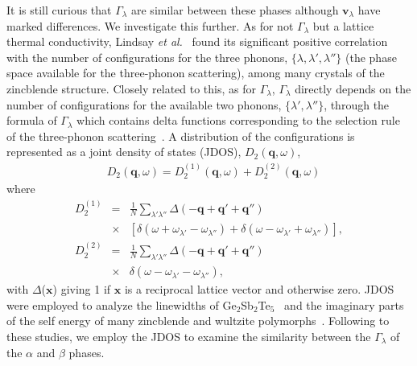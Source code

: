 \documentclass[twocolumn,amsmath,amssymb,a4paper,prb,superscriptaddress,floatfix]{revtex4-1}
\begin{document}
It is still curious that $\Gamma_\lambda$ are similar between these phases
although $\mathbf{v}_\lambda$ have marked differences.  We investigate this
further.  As for not $\Gamma_{\lambda}$ but a lattice thermal conductivity,
Lindsay {\it et al.}~\cite{Lindsay} found its significant positive correlation
with the number of configurations for the three phonons, $\{\lambda, \lambda',
\lambda''\}$ (the phase space available for the three-phonon scattering), among
many crystals of the zincblende structure.  Closely related to this, as for
$\Gamma_{\lambda}$, $\Gamma_{\lambda}$ directly depends on the number of
configurations for the available two phonons, $\{\lambda', \lambda''\}$, through
the formula of $\Gamma_{\lambda}$ which contains delta functions corresponding
to the selection rule of the three-phonon scattering~\cite{phono3py}.  A
distribution of the configurations is represented as a joint density of states
(JDOS), ${D_2(\mathbf{q},\omega)}$,  
\begin{align}
 \label{eq:jdos}
 &D_2(\mathbf{q},\omega) = D_2^{(1)}(\mathbf{q},\omega) +  D_2^{(2)}(\mathbf{q},\omega)
\end{align}
where 
\begin{eqnarray*}
	D_2^{(1)} & = & \frac{1}{N} \sum_{\lambda'\lambda''}\Delta(-\mathbf{q} + \mathbf{q'} + \mathbf{q''}) \nonumber \\
								   & \times & [\delta(\omega + \omega_{\lambda'} - \omega_{\lambda''}) + \delta(\omega - \omega_{\lambda'} + \omega_{\lambda''})],\\
	D_2^{(2)} & = & \frac{1}{N} \sum_{\lambda'\lambda''}\Delta(-\mathbf{q} + \mathbf{q'} + \mathbf{q''}) \nonumber \\
								   & \times & \delta(\omega - \omega_{\lambda'} - \omega_{\lambda''}),
\end{eqnarray*}
with $\Delta$($\mathbf{x}$) giving 1 if $\mathbf{x}$ is a reciprocal lattice
vector and otherwise zero.  JDOS were employed to analyze the linewidths of
Ge$_2$Sb$_2$Te$_5$~\cite{mukhopadhyay-ltc} and the imaginary parts of the self
energy of many zincblende and wultzite polymorphs~\cite{phono3py}.  Following to
these studies, we employ the JDOS to examine the similarity between the
$\Gamma_{\lambda}$ of the $\alpha$ and $\beta$ phases.
\end{document}
